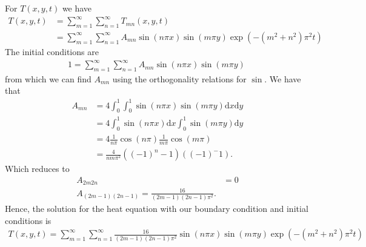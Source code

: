 \documentclass{article}
\begin{document}
For $T(x, y, t)$ we have
\begin{align}
    T(x, y, t) &= \sum_{m=1}^\infty\sum_{n=1}^\infty T_{m n}(x, y, t) \\
    &= \sum_{m=1}^\infty\sum_{n=1}^\infty A_{m n}\sin(n\pi  x) \sin(m\pi  y)\exp(-(m^2+ n^2)\pi^2t)
\end{align}
The initial conditions are
\begin{align}
    1 = \sum_{m=1}^\infty\sum_{n=1}^\infty A_{m n}\sin(n\pi  x) \sin(m\pi  y)\
\end{align}
from which we can find $A_{mn}$ using the orthogonality relations for $\sin$. We have that
\begin{align}
    A_{mn} &= 4 \int_0^1 \int_0^1\sin(n\pi  x) \sin(m\pi  y)\mathrm{d}x\mathrm{d}y \\
    &= 4 \int_0^1 \sin(n\pi  x)\mathrm{d}x\int_0^1 \sin(m\pi  y)\mathrm{d}y \\
    &= 4 \frac{1}{n \pi} \cos(n\pi) \frac{1}{m \pi} \cos(m\pi) \\
    &=\frac{4}{nm\pi^2}\left((-1)^n -1\right)\left((-1)^ -1\right).
\end{align}
Which reduces to
\begin{align}
    A_{2m2n} &=0 \\
    A_{(2m-1)(2n-1)} = \frac{16}{(2m-1)(2n-1)\pi^2}.
\end{align}
Hence, the solution for the heat equation with our boundary condition and initial conditions is
\begin{align}
    T(x, y, t) = \sum_{m=1}^\infty\sum_{n=1}^\infty \frac{16}{(2m-1)(2n-1)\pi^2} \sin(n\pi  x) \sin(m\pi  y)\exp(-(m^2+ n^2)\pi^2t)
\end{align}
\end{document}
